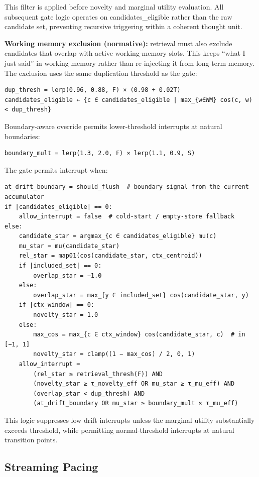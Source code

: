 \documentclass[
  letterpaper,
  DIV=11,
  numbers=noendperiod]{scrartcl}
\begin{document}
This filter is applied before novelty and marginal utility evaluation.
All subsequent gate logic operates on candidates\_eligible rather than
the raw candidate set, preventing recursive triggering within a coherent
thought unit.

\textbf{Working memory exclusion (normative):} retrieval must also
exclude candidates that overlap with active working‑memory slots. This
keeps ``what I just said'' in working memory rather than re‑injecting it
from long‑term memory. The exclusion uses the same duplication threshold
as the gate:

\begin{verbatim}
dup_thresh = lerp(0.96, 0.88, F) × (0.98 + 0.02T)
candidates_eligible ← {c ∈ candidates_eligible | max_{w∈WM} cos(c, w) < dup_thresh}
\end{verbatim}

Boundary-aware override permits lower-threshold interrupts at natural
boundaries:

\begin{verbatim}
boundary_mult = lerp(1.3, 2.0, F) × lerp(1.1, 0.9, S)
\end{verbatim}

The gate permits interrupt when:

\begin{verbatim}
at_drift_boundary = should_flush  # boundary signal from the current accumulator
if |candidates_eligible| == 0:
    allow_interrupt = false  # cold-start / empty-store fallback
else:
    candidate_star = argmax_{c ∈ candidates_eligible} mu(c)
    mu_star = mu(candidate_star)
    rel_star = map01(cos(candidate_star, ctx_centroid))
    if |included_set| == 0:
        overlap_star = −1.0
    else:
        overlap_star = max_{y ∈ included_set} cos(candidate_star, y)
    if |ctx_window| == 0:
        novelty_star = 1.0
    else:
        max_cos = max_{c ∈ ctx_window} cos(candidate_star, c)  # in [−1, 1]
        novelty_star = clamp((1 − max_cos) / 2, 0, 1)
    allow_interrupt =
        (rel_star ≥ retrieval_thresh(F)) AND
        (novelty_star ≥ τ_novelty_eff OR mu_star ≥ τ_mu_eff) AND
        (overlap_star < dup_thresh) AND
        (at_drift_boundary OR mu_star ≥ boundary_mult × τ_mu_eff)
\end{verbatim}

This logic suppresses low-drift interrupts unless the marginal utility
substantially exceeds threshold, while permitting normal-threshold
interrupts at natural transition points.

\subsection{Streaming Pacing}\label{streaming-pacing}
\end{document}
